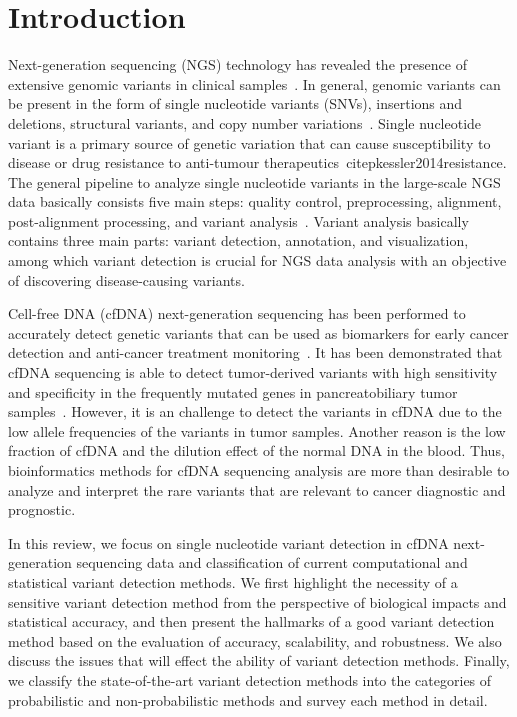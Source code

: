 \documentclass[a4,center,fleqn]{NAR}
\begin{document}
\section{Introduction}
Next-generation sequencing (NGS) technology has revealed the presence of extensive genomic variants in clinical samples~\citep{koboldt2013next}.
In general, genomic variants can be present in the form of single nucleotide variants (SNVs), insertions and deletions, structural variants, and copy number variations~\citep{Bao2014}.
Single nucleotide variant is a primary source of genetic variation that can cause susceptibility to disease or drug resistance to anti-tumour therapeutics~citep{kessler2014resistance}.
The general pipeline to analyze single nucleotide variants in the large-scale NGS data basically consists five main steps: quality control, preprocessing, alignment, post-alignment processing, and variant analysis~\citep{pabinger2014survey, Bao2014}.
Variant analysis basically contains three main parts: variant detection, annotation, and visualization, among which variant detection is crucial for NGS data analysis with an objective of discovering disease-causing variants.


Cell-free DNA (cfDNA) next-generation sequencing has been performed to accurately detect genetic variants that can be used as biomarkers for early cancer detection and anti-cancer treatment monitoring~\citep{schwarzenbach2011cell, zhou2014pilot}.
It has been demonstrated that cfDNA sequencing is able to detect tumor-derived variants with high sensitivity and specificity in the frequently mutated genes in pancreatobiliary tumor samples~\citep{zill2015cell}.
However, it is an challenge to detect the variants in cfDNA due to the low allele frequencies of the variants in tumor samples.
Another reason is the low fraction of cfDNA and the dilution effect of the normal DNA in the blood. 
Thus, bioinformatics methods for cfDNA sequencing analysis are more than desirable to analyze and interpret the rare variants that are relevant to cancer diagnostic and prognostic.


In this review, we focus on single nucleotide variant detection in cfDNA next-generation sequencing data and classification of current computational and statistical variant detection methods.
We first highlight the necessity of a sensitive variant detection method from the perspective of biological impacts and statistical accuracy,
and then present the hallmarks of a good variant detection method based on the evaluation of accuracy, scalability, and robustness.
We also discuss the issues that will effect the ability of variant detection methods.
Finally, we classify the state-of-the-art variant detection methods into the categories of probabilistic and non-probabilistic methods and survey each method in detail.
\end{document}
